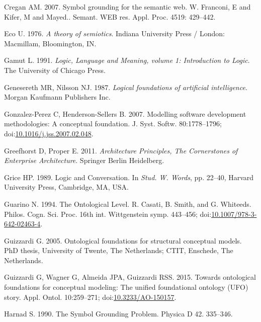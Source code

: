 \documentclass[a4paper,11pt,oneside,oldfontcommands]{memoir}
\theoremstyle{definition}
\theoremstyle{break}		%
\numberwithin{equation}{chapter}
\numberwithin{figure}{chapter}
\begin{document}
\leavevmode\hypertarget{ref-Cregan2007}{}%
Cregan AM. 2007. Symbol grounding for the semantic web. W. Franconi, E
and Kifer, M and Mayed.. Semant. WEB res. Appl. Proc. 4519: 429--442.

\leavevmode\hypertarget{ref-Eco1976}{}%
Eco U. 1976. \emph{A theory of semiotics}. Indiana University Press /
London: Macmillam, Bloomington, IN.

\leavevmode\hypertarget{ref-Gamut1991}{}%
Gamut L. 1991. \emph{Logic, Language and Meaning, volume 1: Introduction
to Logic}. The University of Chicago Press.

\leavevmode\hypertarget{ref-Genesereth:1987dg}{}%
Genesereth MR, Nilsson NJ. 1987. \emph{Logical foundations of artificial
intelligence}. Morgan Kaufmann Publishers Inc.

\leavevmode\hypertarget{ref-Gonzalez-Perez2007}{}%
Gonzalez-Perez C, Henderson-Sellers B. 2007. Modelling software
development methodologies: A conceptual foundation. J. Syst. Softw.
80:1778--1796;
doi:\href{https://doi.org/10.1016/j.jss.2007.02.048}{10.1016/j.jss.2007.02.048}.

\leavevmode\hypertarget{ref-Greefhorst2011}{}%
Greefhorst D, Proper E. 2011. \emph{Architecture Principles, The
Cornerstones of Enterprise Architecture}. Springer Berlin Heidelberg.

\leavevmode\hypertarget{ref-Grice:1991BT}{}%
Grice HP. 1989. Logic and Conversation. In \emph{Stud. W. Words}, pp.
22--40, Harvard University Press, Cambridge, MA, USA.

\leavevmode\hypertarget{ref-Guarino1994b}{}%
Guarino N. 1994. The Ontological Level. R. Casati, B. Smith, and G.
Whiteeds. Philos. Cogn. Sci. Proc. 16th int. Wittgenstein symp.
443--456;
doi:\href{https://doi.org/10.1007/978-3-642-02463-4}{10.1007/978-3-642-02463-4}.

\leavevmode\hypertarget{ref-Guizzardi:2005vt}{}%
Guizzardi G. 2005. Ontological foundations for structural conceptual
models. PhD thesis, University of Twente, The Netherlands; CTIT,
Enschede, The Netherlands.

\leavevmode\hypertarget{ref-Guizzardi:2015ky}{}%
Guizzardi G, Wagner G, Almeida JPA, Guizzardi RSS. 2015. Towards
ontological foundations for conceptual modeling: The unified
foundational ontology (UFO) story. Appl. Ontol. 10:259--271;
doi:\href{https://doi.org/10.3233/AO-150157}{10.3233/AO-150157}.

\leavevmode\hypertarget{ref-Harnad1990}{}%
Harnad S. 1990. The Symbol Grounding Problem. Physica D 42. 335--346.
\end{document}

